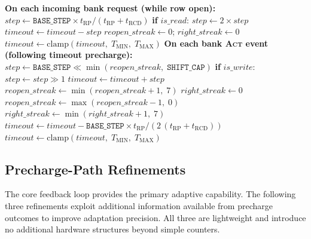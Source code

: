 \documentclass[runningheads]{llncs}
\begin{document}
\begin{algorithm}[!htbp]
\caption{CRAFT Feedback Loop}
\label{alg:craft}
\small
\begin{algorithmic}[1]
\State \textbf{On each incoming bank request (while row open):}
 
  \State $\mathit{step} \leftarrow \texttt{BASE\_STEP} \times t_\mathrm{RP} / (t_\mathrm{RP} + t_\mathrm{RCD})$
  \State \textbf{if} $\mathit{is\_read}$: $\mathit{step} \leftarrow 2 \times \mathit{step}$ \Comment{[RW]}
  \State $\mathit{timeout} \leftarrow \mathit{timeout} - \mathit{step}$ 
  \State $\mathit{reopen\_streak} \leftarrow 0$;\; $\mathit{right\_streak} \leftarrow 0$
  \State $\mathit{timeout} \leftarrow \mathrm{clamp}(\mathit{timeout},\;T_\mathrm{MIN},\;T_\mathrm{MAX})$
\EndIf
\Statex
\State \textbf{On each bank \textsc{Act} event (following timeout precharge):}
   
    \State $\mathit{step} \leftarrow \texttt{BASE\_STEP} \ll \min(\mathit{reopen\_streak},\;\texttt{SHIFT\_CAP})$
    \State \textbf{if} $\mathit{is\_write}$: $\mathit{step} \leftarrow \mathit{step} \gg 1$ \Comment{[RW]}
    \State $\mathit{timeout} \leftarrow \mathit{timeout} + \mathit{step}$ 
    \State $\mathit{reopen\_streak} \leftarrow \min(\mathit{reopen\_streak} + 1,\;7)$
    \State $\mathit{right\_streak} \leftarrow 0$
  \Else {}
    \State $\mathit{reopen\_streak} \leftarrow \max(\mathit{reopen\_streak} - 1,\;0)$ \Comment{[SD]}
    \State $\mathit{right\_streak} \leftarrow \min(\mathit{right\_streak} + 1,\;7)$ \Comment{[RS]}
     \Comment{[RS]}
      \State $\mathit{timeout} \leftarrow \mathit{timeout} - \texttt{BASE\_STEP} \times t_\mathrm{RP} / (2\,(t_\mathrm{RP} + t_\mathrm{RCD}))$ \Comment{[RS]}
    \EndIf
  \EndIf
  \State $\mathit{timeout} \leftarrow \mathrm{clamp}(\mathit{timeout},\;T_\mathrm{MIN},\;T_\mathrm{MAX})$
\EndIf
\end{algorithmic}
\end{algorithm}

\subsection{Precharge-Path Refinements}
\label{sec:refinements}

The core feedback loop provides the primary adaptive capability.
The following three refinements exploit additional information available from precharge outcomes to improve adaptation precision.
All three are lightweight and introduce no additional hardware structures beyond simple counters.
\end{document}
